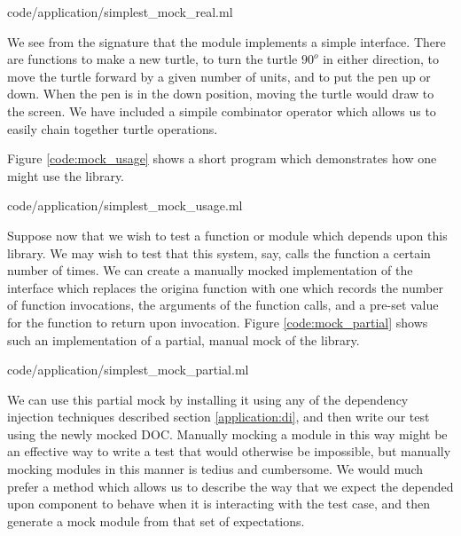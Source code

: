  {code/application/simplest_mock_real.ml}

We see from the  signature that the  module
implements a simple interface. There are functions to make a new
turtle, to turn the turtle $90^o$ in either direction, to move the
turtle forward by a given number of units, and to put the pen up or
down. When the pen is in the down position, moving the turtle would
draw to the screen. We have included a simpile combinator operator
\code{>>} which allows us to easily chain together turtle operations.

Figure \ref{code:mock_usage} shows a short program which demonstrates
how one might use the  library.

 {code/application/simplest_mock_usage.ml}

Suppose now that we wish to test a function or module which depends
upon this  library. We may wish to test that this system,
say, calls the  function a certain number of times. We can
create a manually mocked implementation of the  interface
which replaces the origina  function with one which records
the number of function invocations, the arguments of the function
calls, and a pre-set value for the function to return upon
invocation. Figure \ref{code:mock_partial} shows such an
implementation of a partial, manual mock of the  library.


 {code/application/simplest_mock_partial.ml}

We can use this partial mock by installing it using any of the
dependency injection techniques described section
\ref{application:di}, and then write our test using the newly mocked
DOC. Manually mocking a module in this way might be an effective way
to write a test that would otherwise be impossible, but manually
mocking modules in this manner is tedius and cumbersome. We would much
prefer a method which allows us to describe the way that we expect the
depended upon component to behave when it is interacting with the test
case, and then generate a mock module from that set of expectations.

